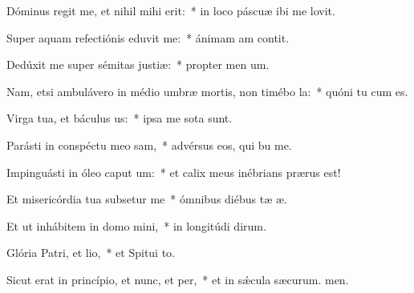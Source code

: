 \item Dóminus regit me, et nihil mihi erit:~* in loco páscuæ ibi me lovit.
\item Super aquam refectiónis eduvit me:~* ánimam am contit.
\item Dedúxit me super sémitas justiæ:~* propter men um.
\item Nam, etsi ambulávero in médio umbræ mortis, non timébo la:~* quóni tu cum es.
\item Virga tua, et báculus us:~* ipsa me sota sunt.
\item Parásti in conspéctu meo sam,~* advérsus eos, qui bu me.
\item Impinguásti in óleo caput um:~* et calix meus inébrians  prærus est!
\item Et misericórdia tua subsetur me~* ómnibus diébus tæ æ.
\item Et ut inhábitem in domo mini,~* in longitúdi dirum.
\item Glória Patri, et lio,~* et Spitui to.
\item Sicut erat in princípio, et nunc, et per,~* et in sǽcula sæcurum. men.
